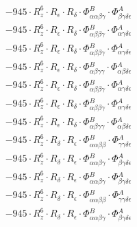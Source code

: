 \documentclass{article}
\begin{document}
\begin{subequations}
\begin{gather}
\begin{array}{c}
 \\[0.2em] 		 - 945 \cdot R_{z}^{6} \cdot R_{\epsilon{}} \cdot R_{\delta{}} \cdot \Phi{}^{B}_{\alpha{}\alpha{}\beta{}\gamma{}} \cdot \Phi{}^{A}_{\beta{}\gamma{}\delta{}\epsilon{}} 
 \\[0.2em] 		 - 945 \cdot R_{z}^{6} \cdot R_{\epsilon{}} \cdot R_{\delta{}} \cdot \Phi{}^{B}_{\alpha{}\beta{}\beta{}\gamma{}} \cdot \Phi{}^{A}_{\alpha{}\gamma{}\delta{}\epsilon{}} 
 \\[0.2em] 		 - 945 \cdot R_{z}^{6} \cdot R_{\epsilon{}} \cdot R_{\delta{}} \cdot \Phi{}^{B}_{\alpha{}\beta{}\beta{}\gamma{}} \cdot \Phi{}^{A}_{\alpha{}\gamma{}\delta{}\epsilon{}} 
 \\[0.2em] 		 - 945 \cdot R_{z}^{6} \cdot R_{\epsilon{}} \cdot R_{\delta{}} \cdot \Phi{}^{B}_{\alpha{}\beta{}\gamma{}\gamma{}} \cdot \Phi{}^{A}_{\alpha{}\beta{}\delta{}\epsilon{}} 
 \\[0.2em] 		 - 945 \cdot R_{z}^{6} \cdot R_{\epsilon{}} \cdot R_{\delta{}} \cdot \Phi{}^{B}_{\alpha{}\beta{}\beta{}\gamma{}} \cdot \Phi{}^{A}_{\alpha{}\gamma{}\delta{}\epsilon{}} 
 \\[0.2em] 		 - 945 \cdot R_{z}^{6} \cdot R_{\epsilon{}} \cdot R_{\delta{}} \cdot \Phi{}^{B}_{\alpha{}\beta{}\beta{}\gamma{}} \cdot \Phi{}^{A}_{\alpha{}\gamma{}\delta{}\epsilon{}} 
 \\[0.2em] 		 - 945 \cdot R_{z}^{6} \cdot R_{\epsilon{}} \cdot R_{\delta{}} \cdot \Phi{}^{B}_{\alpha{}\beta{}\gamma{}\gamma{}} \cdot \Phi{}^{A}_{\alpha{}\beta{}\delta{}\epsilon{}} 
 \\[0.2em] 		 - 945 \cdot R_{z}^{6} \cdot R_{\delta{}} \cdot R_{\epsilon{}} \cdot \Phi{}^{B}_{\alpha{}\alpha{}\beta{}\beta{}} \cdot \Phi{}^{A}_{\gamma{}\gamma{}\delta{}\epsilon{}} 
 \\[0.2em] 		 - 945 \cdot R_{z}^{6} \cdot R_{\delta{}} \cdot R_{\epsilon{}} \cdot \Phi{}^{B}_{\alpha{}\alpha{}\beta{}\gamma{}} \cdot \Phi{}^{A}_{\beta{}\gamma{}\delta{}\epsilon{}} 
 \\[0.2em] 		 - 945 \cdot R_{z}^{6} \cdot R_{\delta{}} \cdot R_{\epsilon{}} \cdot \Phi{}^{B}_{\alpha{}\alpha{}\beta{}\gamma{}} \cdot \Phi{}^{A}_{\beta{}\gamma{}\delta{}\epsilon{}} 
 \\[0.2em] 		 - 945 \cdot R_{z}^{6} \cdot R_{\delta{}} \cdot R_{\epsilon{}} \cdot \Phi{}^{B}_{\alpha{}\alpha{}\beta{}\beta{}} \cdot \Phi{}^{A}_{\gamma{}\gamma{}\delta{}\epsilon{}} 
 \\[0.2em] 		 - 945 \cdot R_{z}^{6} \cdot R_{\delta{}} \cdot R_{\epsilon{}} \cdot \Phi{}^{B}_{\alpha{}\alpha{}\beta{}\gamma{}} \cdot \Phi{}^{A}_{\beta{}\gamma{}\delta{}\epsilon{}} 

\end{array}
\end{gather}
\end{subequations}
\end{document}

